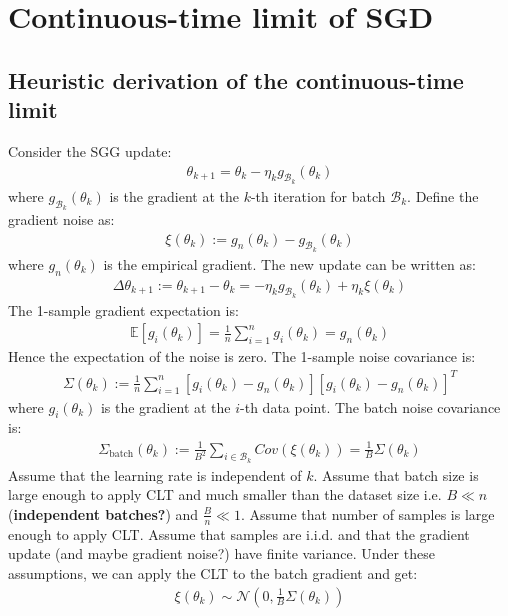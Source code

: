 \documentclass[11pt]{article}
\begin{document}
\section{Continuous-time limit of SGD}

\subsection{Heuristic derivation of the continuous-time limit}
Consider the SGG update:
\begin{align}
\theta_{k+1} = \theta_k - \eta_k g_{\mathcal{B}_k}(\theta_k)
\end{align}
where $g_{\mathcal{B}_k}(\theta_k)$ is the gradient at the $k$-th iteration for batch $\mathcal{B}_k$.
Define the gradient noise as:
\begin{align}
\xi(\theta_k) := g_n(\theta_k) - g_{\mathcal{B}_k}(\theta_k)
\end{align}
where $g_n(\theta_k)$ is the empirical gradient.
The new update can be written as:
\begin{align}
\Delta\theta_{k+1} := \theta_{k+1} - \theta_k = - \eta_k g_{\mathcal{B}_k}(\theta_k) + \eta_k \xi(\theta_k)
\end{align}
The 1-sample gradient expectation is:
\begin{align}
\mathbb{E}[g_i(\theta_k)] = \frac{1}{n} \sum_{i=1}^n g_i(\theta_k) = g_n(\theta_k)
\end{align}
Hence the expectation of the noise is zero.
The 1-sample noise covariance is:
\begin{align}
\Sigma(\theta_k) := \frac{1}{n} \sum_{i=1}^n [g_i(\theta_k) - g_n(\theta_k)][g_i(\theta_k) - g_n(\theta_k)]^T
\end{align}
where $g_i(\theta_k)$ is the gradient at the $i$-th data point. The batch noise covariance is:
\begin{align}
\Sigma_{\text{batch}}(\theta_k) := \frac{1}{B^2}\sum_{i\in\mathcal{B}_k} Cov(\xi(\theta_k)) = \frac{1}{B}\Sigma(\theta_k)
\end{align}
Assume that the learning rate is independent of $k$. Assume that batch size is large enough to apply CLT and much smaller than the dataset size i.e. $B \ll n$ (\textbf{independent batches?}) and $\frac{B}{n} \ll 1$. Assume that number of samples is large enough to apply CLT. Assume that samples are i.i.d. and that the gradient update (and maybe gradient noise?) have finite variance. Under these assumptions, we can apply the CLT to the batch gradient and get:
\begin{align}
\xi(\theta_k) \sim \mathcal{N}(0, \frac{1}{B}\Sigma(\theta_k))
\end{align}
\end{document}
